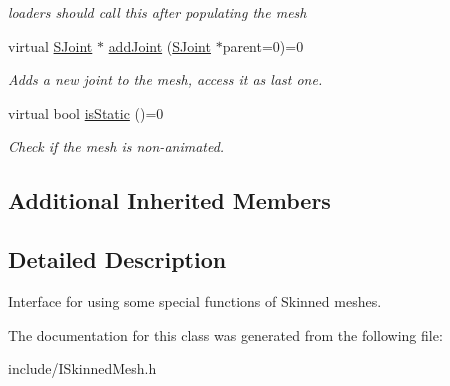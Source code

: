 \begin{DoxyCompactItemize}
\begin{DoxyCompactList}\small\item\em loaders should call this after populating the mesh \end{DoxyCompactList}\item 
virtual \hyperlink{classirr_1_1scene_1_1ICPUSkinnedMesh_1_1SJoint}{S\+Joint} $\ast$ \hyperlink{classirr_1_1scene_1_1ICPUSkinnedMesh_a99cb2728263977178ed1d49eb4b6b345}{add\+Joint} (\hyperlink{classirr_1_1scene_1_1ICPUSkinnedMesh_1_1SJoint}{S\+Joint} $\ast$parent=0)=0\hypertarget{classirr_1_1scene_1_1ICPUSkinnedMesh_a99cb2728263977178ed1d49eb4b6b345}{}\label{classirr_1_1scene_1_1ICPUSkinnedMesh_a99cb2728263977178ed1d49eb4b6b345}

\begin{DoxyCompactList}\small\item\em Adds a new joint to the mesh, access it as last one. \end{DoxyCompactList}\item 
virtual bool \hyperlink{classirr_1_1scene_1_1ICPUSkinnedMesh_a4b2b1dee3654d83a0aa6eb4de46cc816}{is\+Static} ()=0\hypertarget{classirr_1_1scene_1_1ICPUSkinnedMesh_a4b2b1dee3654d83a0aa6eb4de46cc816}{}\label{classirr_1_1scene_1_1ICPUSkinnedMesh_a4b2b1dee3654d83a0aa6eb4de46cc816}

\begin{DoxyCompactList}\small\item\em Check if the mesh is non-\/animated. \end{DoxyCompactList}\end{DoxyCompactItemize}
\subsection*{Additional Inherited Members}


\subsection{Detailed Description}
Interface for using some special functions of Skinned meshes. 

The documentation for this class was generated from the following file\+:\begin{DoxyCompactItemize}
\item 
include/I\+Skinned\+Mesh.\+h\end{DoxyCompactItemize}
